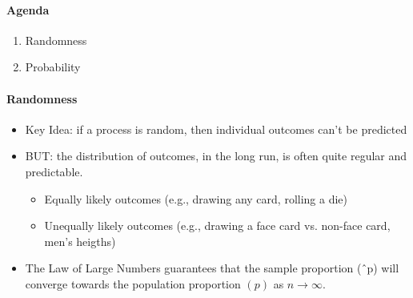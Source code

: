 \documentclass[10pt]{article}\usepackage[]{graphicx}\usepackage[]{color}
\begin{document}
\paragraph{Agenda}
\begin{enumerate}
  \itemsep0em
  \item Randomness
  \item Probability
\end{enumerate}

% 
% 
% 

\paragraph{Randomness}

\begin{itemize}
\item Key Idea: if a process is random, then individual outcomes can’t be predicted
\item BUT: the distribution of outcomes, in the long run, is often quite regular and predictable.
\begin{itemize} 
\item Equally likely outcomes (e.g., drawing any card, rolling a die)
\item Unequally likely outcomes (e.g., drawing a face card vs. non-face card, men’s heigths)
\end{itemize}
\item The Law of Large Numbers guarantees that the sample proportion (ˆp) will converge towards the population proportion $(p)$ as $n \rightarrow \infty$.
\end{itemize}
\end{document}
